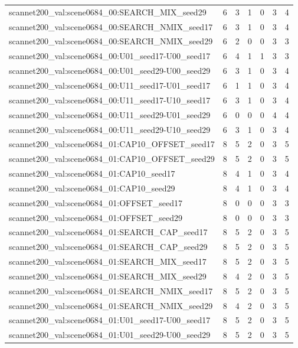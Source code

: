 \begin{table}[t]
\begin{tabular}{lrrrrrr}
scannet200\_val:scene0684\_00:SEARCH\_MIX\_seed29 & 6 & 3 & 1 & 0 & 3 & 4 \\
scannet200\_val:scene0684\_00:SEARCH\_NMIX\_seed17 & 6 & 3 & 1 & 0 & 3 & 4 \\
scannet200\_val:scene0684\_00:SEARCH\_NMIX\_seed29 & 6 & 2 & 0 & 0 & 3 & 3 \\
scannet200\_val:scene0684\_00:U01\_seed17-U00\_seed17 & 6 & 4 & 1 & 1 & 3 & 3 \\
scannet200\_val:scene0684\_00:U01\_seed29-U00\_seed29 & 6 & 3 & 1 & 0 & 3 & 4 \\
scannet200\_val:scene0684\_00:U11\_seed17-U01\_seed17 & 6 & 1 & 1 & 0 & 3 & 4 \\
scannet200\_val:scene0684\_00:U11\_seed17-U10\_seed17 & 6 & 3 & 1 & 0 & 3 & 4 \\
scannet200\_val:scene0684\_00:U11\_seed29-U01\_seed29 & 6 & 0 & 0 & 0 & 4 & 4 \\
scannet200\_val:scene0684\_00:U11\_seed29-U10\_seed29 & 6 & 3 & 1 & 0 & 3 & 4 \\
scannet200\_val:scene0684\_01:CAP10\_OFFSET\_seed17 & 8 & 5 & 2 & 0 & 3 & 5 \\
scannet200\_val:scene0684\_01:CAP10\_OFFSET\_seed29 & 8 & 5 & 2 & 0 & 3 & 5 \\
scannet200\_val:scene0684\_01:CAP10\_seed17 & 8 & 4 & 1 & 0 & 3 & 4 \\
scannet200\_val:scene0684\_01:CAP10\_seed29 & 8 & 4 & 1 & 0 & 3 & 4 \\
scannet200\_val:scene0684\_01:OFFSET\_seed17 & 8 & 0 & 0 & 0 & 3 & 3 \\
scannet200\_val:scene0684\_01:OFFSET\_seed29 & 8 & 0 & 0 & 0 & 3 & 3 \\
scannet200\_val:scene0684\_01:SEARCH\_CAP\_seed17 & 8 & 5 & 2 & 0 & 3 & 5 \\
scannet200\_val:scene0684\_01:SEARCH\_CAP\_seed29 & 8 & 5 & 2 & 0 & 3 & 5 \\
scannet200\_val:scene0684\_01:SEARCH\_MIX\_seed17 & 8 & 5 & 2 & 0 & 3 & 5 \\
scannet200\_val:scene0684\_01:SEARCH\_MIX\_seed29 & 8 & 4 & 2 & 0 & 3 & 5 \\
scannet200\_val:scene0684\_01:SEARCH\_NMIX\_seed17 & 8 & 5 & 2 & 0 & 3 & 5 \\
scannet200\_val:scene0684\_01:SEARCH\_NMIX\_seed29 & 8 & 4 & 2 & 0 & 3 & 5 \\
scannet200\_val:scene0684\_01:U01\_seed17-U00\_seed17 & 8 & 5 & 2 & 0 & 3 & 5 \\
scannet200\_val:scene0684\_01:U01\_seed29-U00\_seed29 & 8 & 5 & 2 & 0 & 3 & 5 \\

\end{tabular}
\end{table}
